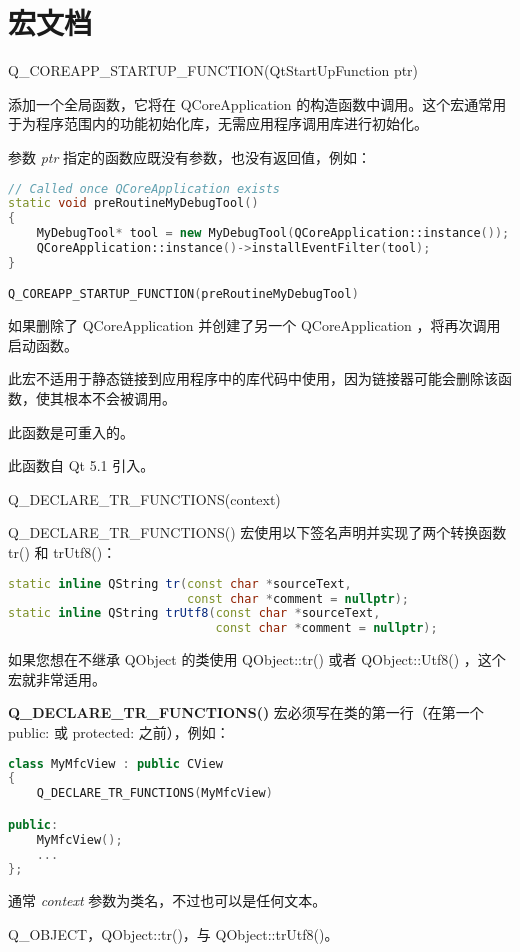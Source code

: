 \splitLine

\section{宏文档}

Q\_COREAPP\_STARTUP\_FUNCTION(QtStartUpFunction ptr)

添加一个全局函数，它将在 QCoreApplication 的构造函数中调用。这个宏通常用于为程序范围内的功能初始化库，无需应用程序调用库进行初始化。

参数 \emph{ptr} 指定的函数应既没有参数，也没有返回值，例如：


\begin{lstlisting}[language=C++]
// Called once QCoreApplication exists
static void preRoutineMyDebugTool()
{
    MyDebugTool* tool = new MyDebugTool(QCoreApplication::instance());
    QCoreApplication::instance()->installEventFilter(tool);
}

Q_COREAPP_STARTUP_FUNCTION(preRoutineMyDebugTool)
\end{lstlisting}



 

如果删除了 QCoreApplication 并创建了另一个 QCoreApplication ，将再次调用启动函数。

 
\begin{notice}
此宏不适用于静态链接到应用程序中的库代码中使用，因为链接器可能会删除该函数，使其根本不会被调用。
\end{notice}


\begin{notice}
 此函数是可重入的。
\end{notice}


此函数自 Qt 5.1 引入。

\splitLine

Q\_DECLARE\_TR\_FUNCTIONS(context)

Q\_DECLARE\_TR\_FUNCTIONS() 宏使用以下签名声明并实现了两个转换函数 tr() 和 trUtf8()：

\begin{lstlisting}[language=C++]
static inline QString tr(const char *sourceText,
                         const char *comment = nullptr);
static inline QString trUtf8(const char *sourceText,
                             const char *comment = nullptr);
\end{lstlisting}

如果您想在不继承 QObject 的类使用 QObject::tr() 或者 QObject::Utf8() ，这个宏就非常适用。

\textbf{Q\_DECLARE\_TR\_FUNCTIONS()} 宏必须写在类的第一行（在第一个 public: 或
protected: 之前），例如：

\begin{lstlisting}[language=C++]
class MyMfcView : public CView
{
    Q_DECLARE_TR_FUNCTIONS(MyMfcView)

public:
    MyMfcView();
    ...
};
\end{lstlisting}

通常 \emph{context} 参数为类名，不过也可以是任何文本。

\begin{seeAlso}
	Q\_OBJECT，QObject::tr()，与 QObject::trUtf8()。
\end{seeAlso}
